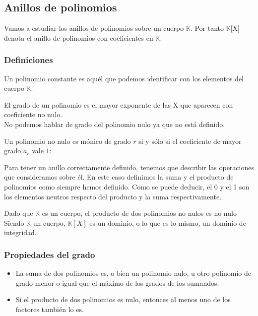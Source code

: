 \documentclass[nochap]{apuntes}
\begin{document}
\subsection{Anillos de polinomios}

Vamos a estudiar los anillos de polinomios sobre un cuerpo $\mathbb{K}$. Por tanto $\mathbb{K}$[X] denota el anillo de polinomios con
coeficientes en $\mathbb{K}$.

\subsubsection{Definiciones}
\begin{defn} Un polinomio constante es aquél que podemos identificar con los elementos del cuerpo $\mathbb{K}$.
\end{defn}

\begin{defn}
 El grado de un polinomio es el mayor exponente de las X que aparecen con coeficiente no nulo.\\
 No podemos hablar de grado del polinomio nulo ya que no está definido.
\end{defn}

\begin{defn}
 Un polinomio no nulo es mónico de grado $r$ si y sólo si el coeficiente de mayor grado $a_r$ vale $1$:
\end{defn}

Para tener un anillo correctamente definido, tenemos que describir las operaciones que consideramos sobre él. En este caso definimos la suma y el producto de polinomios como siempre hemos definido. Como se puede deducir, el 0 y el 1 son los elementos neutros respecto del producto y la suma respectivamente.

\obs Dado que $\mathbb{K}$  es un cuerpo, el producto de dos polinomios no nulos es no nulo
\obs Siendo $\mathbb{K}$ un cuerpo, $\mathbb{K}[X]$ es un dominio, o lo que es lo mismo, un dominio de integridad.

\subsubsection{Propiedades del grado}
\begin{itemize}
 \item La suma de dos polinomios es, o bien un polinomio nulo, u otro polinomio de grado menor o igual que el máximo de los grados de los sumandos.
 \item Si el producto de dos polinomios es nulo, entonces al menos uno de los factores también lo es.
\end{itemize}
\end{document}
